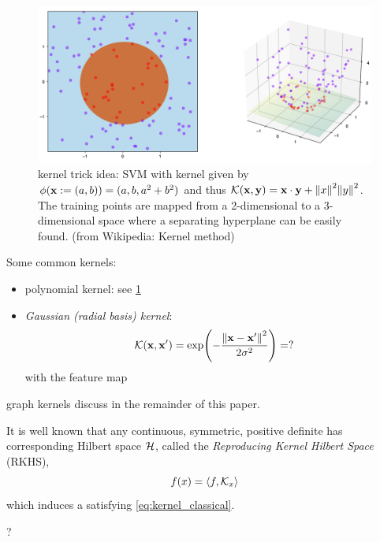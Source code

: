 \begin{figure}[!ht]
	\centering
	\includegraphics[width=0.6\linewidth]{Kernel_trick_idea.png}
	\caption{kernel trick idea: SVM with kernel given by $\phi(\vb{x}:=(a, b)) = (a, b, a^2 + b^2)$ and thus $\mathcal{K}(\vb{x},\vb{y})=\vb{x}\cdot \vb{y}+\norm{x}^2 \norm{y}^2$. The training points are mapped from a 2-dimensional to a 3-dimensional space where a separating hyperplane can be easily found. (from Wikipedia: Kernel method)}
	\label{fig:kernel}
\end{figure}
Some common kernels: 
\begin{itemize}
	\item polynomial kernel:
	see \cref{fig:kernel}

	\item \emph{Gaussian (radial basis) kernel}:
	\begin{equation}
		\mathcal{K}(\vb{x},\vb{x}') = 
		\exp(-\frac{\norm{\vb{x}-\vb{x}'}^2}{2\sigma^2})
		=?
	\end{equation}
	with the feature map
\end{itemize}
graph kernels discuss in the remainder of this paper.

\begin{definition}
	It is well known that any continuous, symmetric, positive definite  has corresponding Hilbert space $\mathcal{H}$, called the \emph{Reproducing Kernel Hilbert Space} (RKHS),
	\begin{equation}
		f(x) = \expval{f,\mathcal{K}_x}
	\end{equation}
	which induces a 
	satisfying \cref{eq:kernel_classical}.
\end{definition}
\begin{theorem}
	?
\end{theorem}

